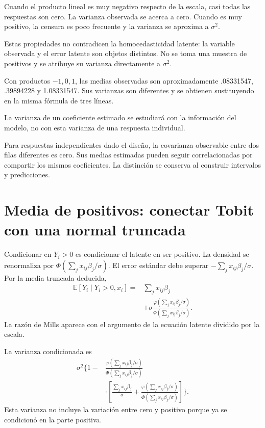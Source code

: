 \documentclass[11pt,a4paper]{article}
\newcommand{\E}{\mathbb E}
\begin{document}
Cuando el producto lineal
es muy negativo respecto de la escala,
casi todas las respuestas son cero.
La varianza observada se acerca a cero.
Cuando es muy positivo,
la censura es poco frecuente
y la varianza se aproxima a \(\sigma^2\).

Estas propiedades no contradicen
la homocedasticidad latente:
la variable observada y
el error latente son objetos distintos.
No se toma una muestra de positivos
y se atribuye su varianza
directamente a \(\sigma^2\).

\begin{ejemplo}
Con productos \(-1,0,1\),
las medias observadas son aproximadamente
.08331547, .39894228 y 1.08331547.
Sus varianzas son diferentes
y se obtienen sustituyendo en
la misma fórmula de tres líneas.
\end{ejemplo}
La varianza de un coeficiente
estimado se estudiará con
la información del modelo,
no con esta varianza
de una respuesta individual.

Para respuestas independientes dado
el diseño, la covarianza observable
entre dos filas diferentes es cero.
Sus medias estimadas pueden
seguir correlacionadas por
compartir los mismos coeficientes.
La distinción se conserva
al construir intervalos y predicciones.

\clearpage
\section{Media de positivos: conectar Tobit con una normal truncada}\label{unidad88}
Condicionar en \(Y_i>0\)
es condicionar el latente en ser positivo.
La densidad se renormaliza por
\(\Phi(\sum_jx_{ij}\beta_j/\sigma)\).
El error estándar debe superar
\(-\sum_jx_{ij}\beta_j/\sigma\).
Por la media truncada deducida,
\[
\begin{aligned}
\E[Y_i\mid Y_i>0,x_i]
={}&\sum_jx_{ij}\beta_j\\
&+\sigma
\frac{\varphi(\sum_jx_{ij}\beta_j/\sigma)}
{\Phi(\sum_jx_{ij}\beta_j/\sigma)}.
\end{aligned}
\]
La razón de Mills aparece
con el argumento de la ecuación latente
dividido por la escala.

La varianza condicionada es
\[
\begin{aligned}
\sigma^2\Bigg\{1-&
\frac{\varphi(\sum_jx_{ij}\beta_j/\sigma)}
{\Phi(\sum_jx_{ij}\beta_j/\sigma)}\\
&\cdot\left[
\frac{\sum_jx_{ij}\beta_j}{\sigma}
+\frac{\varphi(\sum_jx_{ij}\beta_j/\sigma)}
{\Phi(\sum_jx_{ij}\beta_j/\sigma)}
\right]\Bigg\}.
\end{aligned}
\]
Esta varianza no incluye la
variación entre cero y positivo
porque ya se condicionó
en la parte positiva.
\end{document}
